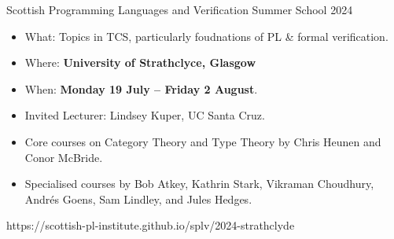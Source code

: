 \documentclass[handout]{beamer}
\begin{document}
\begin{frame}{Scottish Programming Languages and Verification Summer School 2024}
\begin{itemize}
  \item What: Topics in TCS, particularly foudnations of PL \& formal verification.
  \item Where: \textbf{University of Strathclyce, Glasgow}
  \item When: \textbf{Monday 19 July -- Friday 2 August}.
  \item Invited Lecturer: Lindsey Kuper, UC Santa Cruz.
  \item Core courses on Category Theory and Type Theory by Chris Heunen and Conor McBride.
  \item Specialised courses by Bob Atkey, Kathrin Stark, Vikraman Choudhury, Andr\'{e}s Goens, Sam Lindley, and Jules Hedges.
\end{itemize}

\begin{center}
  https://scottish-pl-institute.github.io/splv/2024-strathclyde
\end{center}
\end{frame}
\end{document}
